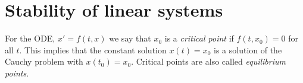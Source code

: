 \documentclass[12pt]{report}
\begin{document}


\section{Stability of linear systems}

For the ODE, $x'=f(t,x)$ we say that $x_0$ is a {\em critical point}
if $f(t,x_0)=0$ for all $t$. This implies that the constant solution
$x(t)= x_0$ is a solution of the Cauchy problem with
$x(t_0)=x_0$. Critical points are also called {\em equilibrium
points}.
\end{document}
